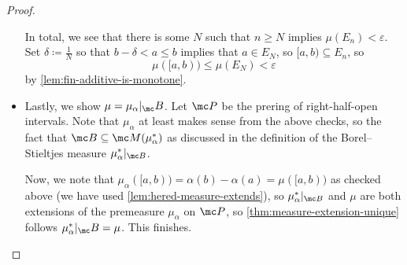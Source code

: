 \documentclass[../notes.tex]{subfiles}
\begin{document}
\begin{proof}
\begin{itemize}
		In total, we see that there is some $N$ such that $n\ge N$ implies $\mu(E_n)<\varepsilon$. Set $\delta\coloneqq\frac1{N}$ so that $b-\delta<a\le b$ implies that $a\in E_N$, so $[a,b)\subseteq E_n$, so
		\[\mu([a,b))\le\mu(E_N)<\varepsilon\]
		by \autoref{lem:fin-additive-is-monotone}.
		\item Lastly, we show $\mu=\mu_\alpha|_\mc B$. Let $\mc P$ be the prering of right-half-open intervals. Note that $\mu_\alpha$ at least makes sense from the above checks, so the fact that $\mc B\subseteq\mc M(\mu^*_\alpha)$ as discussed in the definition of the Borel--Stieltjes measure $\mu_\alpha^*|_{\mc B}$.

		Now, we note that $\mu_\alpha([a,b))=\alpha(b)-\alpha(a)=\mu([a,b))$ as checked above (we have used \autoref{lem:hered-measure-extends}), so $\mu_\alpha^*|_{\mc B}$ and $\mu$ are both extensions of the premeasure $\mu_\alpha$ on $\mc P$, so \autoref{thm:measure-extension-unique} follows $\mu_\alpha^*|_\mc B=\mu$. This finishes.
		\qedhere
	\end{itemize}
\end{proof}
\end{document}
